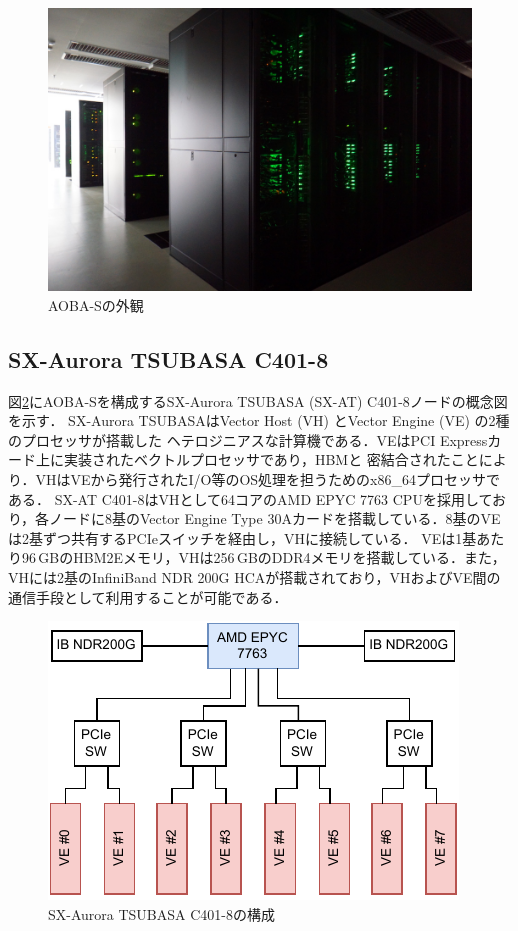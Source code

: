 ﻿\documentclass[submit,techrep,noauthor]{ipsj}
\begin{document}
\begin{figure}
  \centering
  \includegraphics[width=.9\columnwidth]{figs/rack.jpg}
  \caption{AOBA-Sの外観}\label{fig:aoba-s}
\end{figure}

\subsection{SX-Aurora TSUBASA C401-8}

図\ref{fig:node}にAOBA-Sを構成するSX-Aurora TSUBASA (SX-AT) C401-8ノードの概念図を示す．
SX-Aurora TSUBASAはVector Host (VH) とVector Engine (VE) の2種のプロセッサが搭載した
ヘテロジニアスな計算機である．VEはPCI Expressカード上に実装されたベクトルプロセッサであり，HBMと
密結合されたことにより．VHはVEから発行されたI/O等のOS処理を担うためのx86\_64プロセッサである．
SX-AT C401-8はVHとして64コアのAMD EPYC 7763 CPUを採用しており，各ノードに8基のVector Engine Type
30Aカードを搭載している．8基のVEは2基ずつ共有するPCIeスイッチを経由し，VHに接続している．
VEは1基あたり96\,GBのHBM2Eメモリ，VHは256\,GBのDDR4メモリを搭載している．また，VHには2基のInfiniBand
NDR 200G HCAが搭載されており，VHおよびVE間の通信手段として利用することが可能である．

\begin{figure}
  \centering
  \includegraphics{figs/node_arch.pdf}
  \caption{SX-Aurora TSUBASA C401-8の構成}\label{fig:node}
\end{figure}
\end{document}

